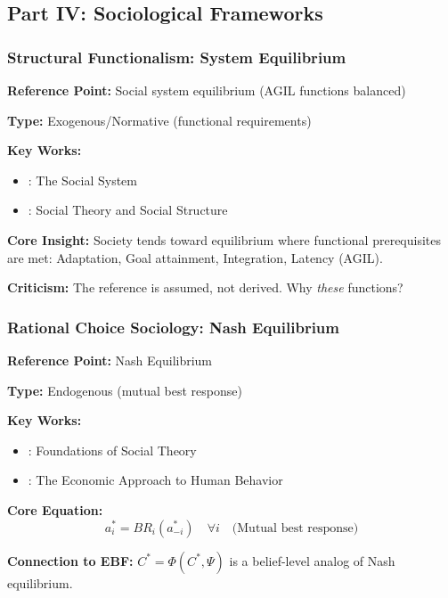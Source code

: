 
\subsection{Part IV: Sociological Frameworks}
\label{sec:AY-sociology}

\subsubsection{Structural Functionalism: System Equilibrium}

\begin{tcolorbox}[colback=gray!5!white, colframe=gray!75!black]
\textbf{Reference Point:} Social system equilibrium (AGIL functions balanced)

\textbf{Type:} Exogenous/Normative (functional requirements)

\textbf{Key Works:}
\begin{itemize}[nosep]
    \item \citet{parsons1951}: The Social System
    \item \citet{merton1968}: Social Theory and Social Structure
\end{itemize}

\textbf{Core Insight:}
Society tends toward equilibrium where functional prerequisites are met:
Adaptation, Goal attainment, Integration, Latency (AGIL).

\textbf{Criticism:}
The reference is assumed, not derived. Why \emph{these} functions?
\end{tcolorbox}

\subsubsection{Rational Choice Sociology: Nash Equilibrium}

\begin{tcolorbox}[colback=gray!5!white, colframe=gray!75!black]
\textbf{Reference Point:} Nash Equilibrium

\textbf{Type:} Endogenous (mutual best response)

\textbf{Key Works:}
\begin{itemize}[nosep]
    \item \citet{coleman1990}: Foundations of Social Theory
    \item \citet{becker1976}: The Economic Approach to Human Behavior
\end{itemize}

\textbf{Core Equation:}
\begin{equation}
a_i^* = BR_i(a_{-i}^*) \quad \forall i \quad \text{(Mutual best response)}
\end{equation}

\textbf{Connection to EBF:}
$C^* = \Phi(C^*, \Psi)$ is a belief-level analog of Nash equilibrium.
\end{tcolorbox}

